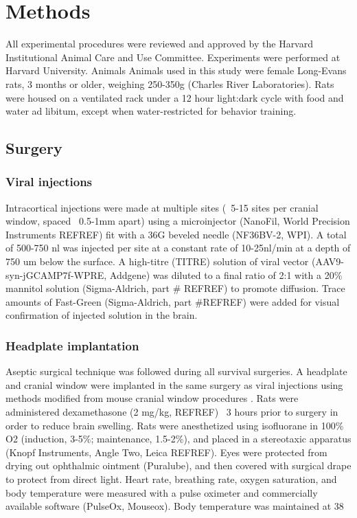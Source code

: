 \chapter{Methods}
\label{methods}


All experimental procedures were reviewed and approved by the Harvard Institutional Animal Care and Use Committee. Experiments were performed at Harvard University. 
Animals
Animals used in this study were female Long-Evans rats, 3 months or older, weighing 250-350g (Charles River Laboratories). Rats were housed on a ventilated rack under a 12 hour light:dark cycle with food and water ad libitum, except when water-restricted for behavior training. 

\section{Surgery}
\subsection{Viral injections}
Intracortical injections were made at multiple sites (~5-15 sites per cranial window, spaced ~0.5-1mm apart) using a microinjector (NanoFil, World Precision Instruments REFREF) fit with a 36G beveled needle (NF36BV-2, WPI). A total of 500-750 nl was injected per site at a constant rate of 10-25nl/min at a depth of 750 um below the surface. A high-titre (TITRE) solution of viral vector (AAV9-syn-jGCAMP7f-WPRE, Addgene) was diluted to a final ratio of 2:1 with a 20\% mannitol solution (Sigma-Aldrich, part # REFREF) to promote diffusion. Trace amounts of Fast-Green (Sigma-Aldrich, part #REFREF) were added for visual confirmation of injected solution in the brain.

\subsection{Headplate implantation}
Aseptic surgical technique was followed during all survival surgeries. A headplate and cranial window were implanted in the same surgery as viral injections using methods modified from mouse cranial window procedures \cite{Goldey2014}. Rats were administered dexamethasone (2 mg/kg, REFREF) ~3 hours prior to surgery in order to reduce brain swelling. Rats were anesthetized using isofluorane in 100\% O2 (induction, 3-5\%; maintenance, 1.5-2\%), and placed in a stereotaxic apparatus (Knopf Instruments, Angle Two, Leica REFREF). Eyes were protected from drying out ophthalmic ointment (Puralube), and then covered with surgical drape to protect from direct light. Heart rate, breathing rate, oxygen saturation, and body temperature were measured with a pulse oximeter and commercially available software (PulseOx, Mouseox). Body temperature was maintained at 38%

